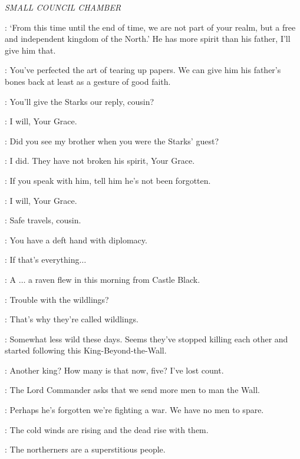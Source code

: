 

\scene

\textit{SMALL COUNCIL CHAMBER}


\CERSEI: `From this time until the end of time, we are not part of your realm, but a free and independent kingdom of the North.' He has more spirit than his father, I'll give him that.

\TYRION: You've perfected the art of tearing up papers. We can give him his father's bones back at least as a gesture of good faith.

\CERSEI: You'll give the Starks our reply, cousin?

\ALTON: I will, Your Grace.

\CERSEI: Did you see my brother when you were the Starks' guest?

\ALTON: I did. They have not broken his spirit, Your Grace.

\CERSEI: If you speak with him, tell him he's not been forgotten.

\ALTON: I will, Your Grace.

\TYRION: Safe travels, cousin.


\TYRION: You have a deft hand with diplomacy.

\CERSEI: If that's everything$\ldots$

\PYCELLE: A $\ldots$ a raven flew in this morning from Castle Black.


\VARYS: Trouble with the wildlings?

\LITTLEFINGER: That's why they're called wildlings.

\VARYS: Somewhat less wild these days. Seems they've stopped killing each other and started following this King-Beyond-the-Wall.

\CERSEI: Another king? How many is that now, five? I've lost count.

\TYRION: The Lord Commander asks that we send more men to man the Wall.

\CERSEI: Perhaps he's forgotten we're fighting a war. We have no men to spare.

\TYRION: The cold winds are rising and the dead rise with them.

\PYCELLE: The northerners are a superstitious people.

